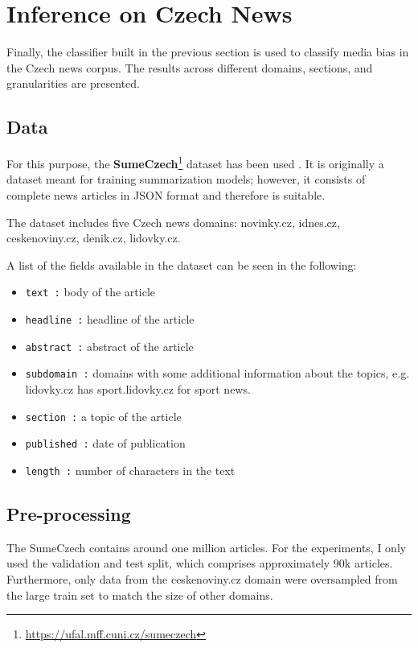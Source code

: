 \chapter{Inference on Czech News}\label{inference}
Finally, the classifier built in the previous section is used to classify media bias in the Czech news corpus. The results across different domains, sections, and granularities are presented.



\section{Data}
For this purpose, the \textbf{SumeCzech}\footnote{\url{https://ufal.mff.cuni.cz/sumeczech}} dataset has been used \cite{straka2018sumeczech}. It is originally a dataset meant for training summarization models; however, it consists of complete news articles in JSON format and therefore is suitable.

The dataset includes five Czech news domains: novinky.cz, idnes.cz, ceskenoviny.cz, denik.cz, lidovky.cz. 

A list of the fields available in the dataset can be seen in the following:
\begin{itemize}
    \item \verb|text :| body of the article
    \item \verb|headline :| headline of the article
    \item \verb|abstract :|  abstract of the article
    \item \verb|subdomain :| domains with some additional information about the topics, e.g. lidovky.cz has sport.lidovky.cz for sport news.
    \item \verb|section :| a topic of the article
    \item \verb|published :| date of publication
    \item \verb|length :| number of characters in the text
\end{itemize}



\section{Pre-processing}
The SumeCzech contains around one million articles. For the experiments, I only used the validation and test split, which comprises approximately 90k articles. Furthermore, only data from the ceskenoviny.cz domain were oversampled from the large train set to match the size of other domains.

